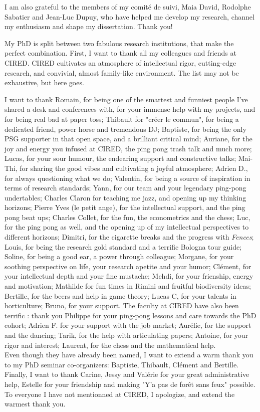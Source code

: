 I am also grateful to the members of my comité de suivi, Maia David, Rodolphe Sabatier and Jean-Luc Dupuy, who have helped me develop my research, channel my enthusiasm and shape my dissertation. Thank you!


My PhD is split between two fabulous research institutions, that make the perfect combination.
First, I want to thank all my colleagues and friends at CIRED. CIRED cultivates an atmosphere of intellectual rigor, cutting-edge research, and convivial, almost family-like environment. The list may not be exhaustive, but here goes. 

I want to thank Romain, for being one of the smartest and funniest people I've shared a desk and conferences with, for your immense help with my projects, and for being real bad at paper toss; Thibault for "créer le commun", for being a dedicated friend, power horse and tremendous DJ; Baptiste, for being the only PSG supporter in that open space, and a brilliant critical mind;  Auriane, for the joy and energy you infused at CIRED, the ping pong trash talk and much more; Lucas, for your sour humour, the endearing support and constructive talks; Mai-Thi, for sharing the good vibes and cultivating a joyful atmosphere; Adrien D., for always questioning what we do; Valentin, for being a source of inspiration in terms of research standards; Yann, for our team and your legendary ping-pong undertables; Charles Claron for teaching me jazz, and opening up my thinking horizons; Pierre Yves (le petit ange), for the intellectual support, and the ping pong beat ups; Charles Collet, for the fun, the econometrics and the chess; Luc, for the ping pong as well, and the opening up of my intellectual perspectives to different horizons; Dimitri, for the cigarette breaks and the progress with \textit{Fences}; Louis, for being the research gold standard and a terrific Bologna tour guide; Soline, for being a good ear, a power through colleague; Morgane, for your soothing perspective on life, your research apetite and your humor; Clément, for your intellectual depth and your fine mustache; Mehdi, for your frienship, energy and motivation; Mathilde for fun times in Rimini and fruitful biodiversity ideas; Bertille, for the beers and help in game theory;  Lucas C, for your talents in horticulture; Bruno, for your support. The faculty at CIRED have also been terrific : thank you Philippe for your ping-pong lessons and care towards the PhD cohort; Adrien F. for your support with the job market; Aurélie, for the support and the dancing; Tarik, for the help with articulating papers; Antoine, for your rigor and interest; Laurent, for the chess and the mathematical help. 
\\
Even though they have already been named, I want to extend a warm thank you to my  PhD seminar co-organizers: Baptiste, Thibault, Clément and Bertille. \\
Finally, I want to thank Carine, Jessy and Valérie for your great administrative help, Estelle for your friendship and making "Y'a pas de forêt sans feux" possible. To everyone I have not mentionned at CIRED, I apologize, and extend the warmest thank you. 



